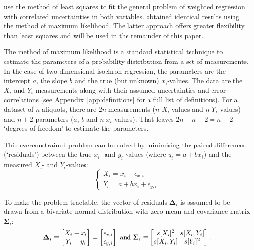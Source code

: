 \documentclass{article}
\begin{document}
\citet{york2004} use the method of least squares to fit the general
problem of weighted regression with correlated uncertainties in both
variables. \citet{titterington1979} obtained identical results using
the method of maximum likelihood. The latter approach offers greater
flexibility than least squares and will be used in the remainder of
this paper.\medskip

The method of maximum likelihood is a standard statistical technique
to estimate the parameters of a probability distribution from a set of
measurements. In the case of two-dimensional isochron regression, the
parameters are the intercept $a$, the slope $b$ and the true (but
unknown) $x_i$-values. The data are the $X_i$ and $Y_i$-measurements
along with their assumed uncertainties and error correlations (see
Appendix~\ref{app:definitions} for a full list of definitions). For a
dataset of $n$ aliquots, there are $2n$ measurements ($n$ $X_i$-values
and $n$ $Y_i$-values) and $n+2$ parameters ($a$, $b$ and $n$
$x_i$-values). That leaves $2n-n-2=n-2$ `degrees of freedom' to
estimate the parameters.\medskip

This overconstrained problem can be solved by minimising the paired
differences (`residuals') between the true $x_i$- and $y_i$-values
(where $y_i = a + b x_i$) and the measured $X_i$- and $Y_i$-values:
\begin{equation}
  \begin{cases}
    X_i = x_i + \epsilon_{x,i} \\
    Y_i = a + b x_i + \epsilon_{y,i}
  \end{cases}
  \label{eq:model1}
\end{equation}

To make the problem tractable, the vector of residuals
$\mathbf{\Delta}_i$ is assumed to be drawn from a bivariate normal
distribution with zero mean and covariance matrix $\mathbf{\Sigma}_i$:
\begin{equation}
  \mathbf{\Delta}_i \equiv
  \left[
    \begin{array}{@{}c@{}}
      X_i - x_i\\
      Y_i - y_i
    \end{array}
    \right]
  =
  \left[
    \begin{array}{@{}c@{}}
      \epsilon_{x,i}\\
      \epsilon_{y,i} 
    \end{array}
    \right]
  \mbox{~and~}
  \mathbf{\Sigma}_i \equiv
  \left[
    \begin{array}{@{}c@{~}c@{}}
      s[X_i]^2 & s[X_i,Y_i]\\
      s[X_i,Y_i] & s[Y_i]^2
    \end{array}
    \right].
  \label{eq:model1DEi}
\end{equation}
\end{document}
